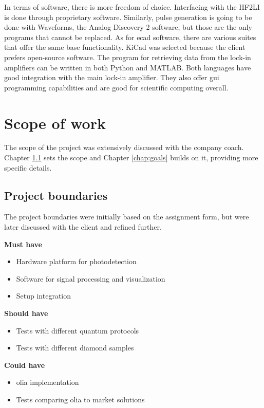 In terms of software, there is more freedom of choice. Interfacing with the HF2LI is done through proprietary software. Similarly, pulse generation is going to be done with Waveforms, the Analog Discovery 2 software, but those are the only programs that cannot be replaced. As for \gls{ecad} software, there are various suites that offer the same base functionality. KiCad was selected because the client prefers open-source software. The program for retrieving data from the lock-in amplifiers can be written in both Python and MATLAB. Both languages have good integration with the main lock-in amplifier. They also offer \gls{gui} programming capabilities and are good for scientific computing overall. 



\section{Scope of work}
The scope of the project was extensively discussed with the company coach. Chapter \ref{chap:project_boundaries} sets the scope and Chapter \ref{chap:goals} builds on it, providing more specific details.

\subsection{Project boundaries}\label{chap:project_boundaries}
The project boundaries were initially based on the assignment form, but were later discussed with the client and refined further. 

\textbf{Must have}
\begin{itemize}
	\item Hardware platform for photodetection
	\item Software for signal processing and visualization
	\item Setup integration
\end{itemize}

\textbf{Should have}
\begin{itemize}
	\item Tests with different quantum protocols
	\item Tests with different diamond samples
\end{itemize}

\textbf{Could have}
\begin{itemize}
	\item \gls{olia} implementation
	\item Tests comparing \gls{olia} to market solutions
\end{itemize}

